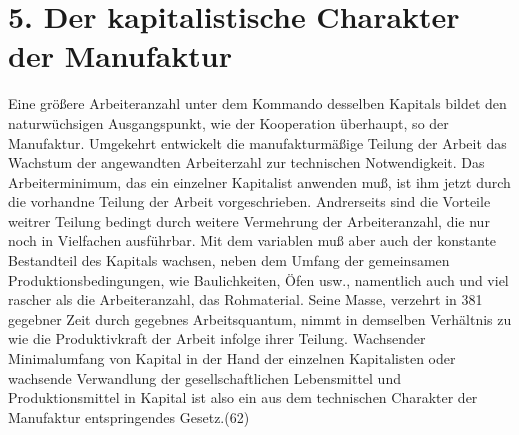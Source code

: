 {{%
\section{5. Der kapitalistische Charakter der
Manufaktur}\label{der-kapitalistische-charakter-der-manufaktur}}

Eine größere Arbeiteranzahl unter dem Kommando desselben Kapitals bildet
den naturwüchsigen Ausgangspunkt, wie der Kooperation überhaupt, so der
Manufaktur. Umgekehrt entwickelt die manufakturmäßige Teilung der Arbeit
das Wachstum der angewandten Arbeiterzahl zur technischen Notwendigkeit.
Das Arbeiterminimum, das ein einzelner Kapitalist anwenden muß, ist ihm
jetzt durch die vorhandne Teilung der Arbeit vorgeschrieben. Andrerseits
sind die Vorteile weitrer Teilung bedingt durch weitere Vermehrung der
Arbeiteranzahl, die nur noch in Vielfachen ausführbar. Mit dem variablen
muß aber auch der konstante Bestandteil des Kapitals wachsen, neben dem
Umfang der gemeinsamen Produktionsbedingungen, wie Baulichkeiten, Öfen
usw., namentlich auch und viel rascher als die Arbeiteranzahl, das
Rohmaterial. Seine Masse, verzehrt in \num{381}
gegebner Zeit durch gegebnes Arbeitsquantum, nimmt in demselben
Verhältnis zu wie die Produktivkraft der Arbeit infolge ihrer Teilung.
Wachsender Minimalumfang von Kapital in der Hand der einzelnen
Kapitalisten oder wachsende Verwandlung der gesellschaftlichen
Lebensmittel und Produktionsmittel in Kapital ist also ein aus dem
technischen Charakter der Manufaktur entspringendes Gesetz.(62)

}
